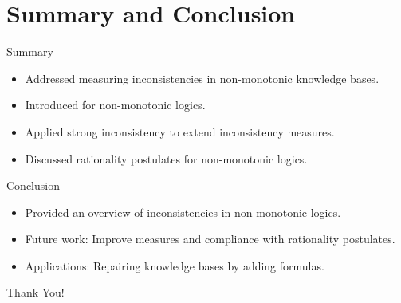 \section{Summary and Conclusion}

\begin{frame}{Summary}
    \begin{itemize}
        \item Addressed measuring inconsistencies in non-monotonic knowledge bases.
        \item Introduced  for non-monotonic logics.
        \item Applied strong inconsistency to extend inconsistency measures.
        \item Discussed rationality postulates for non-monotonic logics.
    \end{itemize}
\end{frame}

\begin{frame}{Conclusion}
    \begin{itemize}
        \item Provided an overview of inconsistencies in non-monotonic logics.
        \item Future work: Improve measures and compliance with rationality postulates.
        \item Applications: Repairing knowledge bases by adding formulas.
    \end{itemize}
\end{frame}

\begin{frame}
    \begin{center}
        \Huge{Thank You!}
    \end{center}
\end{frame}

